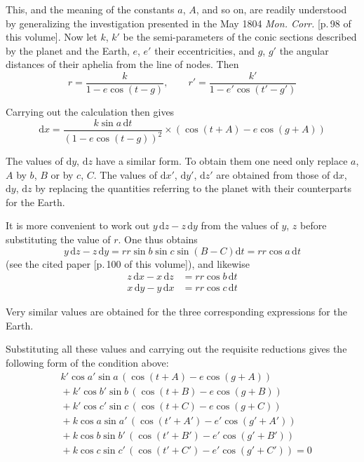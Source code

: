 This, and the meaning of the constants $a$, $A$, and so on, are
readily understood by generalizing the investigation presented in the
May 1804 \textit{Mon. Corr.} [p.\,98 of this volume]. Now let $k$, $k'$
%
be the semi-parameters of the conic sections described by the planet
and the Earth, $e$, $e'$ their eccentricities, and $g$, $g'$ the angular
distances of their aphelia from the line of nodes. Then
\[
r=\frac{k}{1-e\cos(t-g)},\qquad r'=\frac{k'}{1-e'\cos(t'-g')}
\]

Carrying out the calculation then gives
\[
\mathrm{d}x=\frac{k\sin a\,\mathrm{d}t}{(1-e\cos(t-g))^2}\times(\cos(t+A)-e\cos(g+A))
\]

The values of $\mathrm{d}y$, $\mathrm{d}z$ have a similar form. To
obtain them one need only replace $a$, $A$ by $b$, $B$ or by $c$, $C$.
The values of $\mathrm{d}x'$, $\mathrm{d}y'$, $\mathrm{d}z'$ are obtained
from those of $\mathrm{d}x$, $\mathrm{d}y$, $\mathrm{d}z$ by replacing the
quantities referring to the planet with their counterparts for the Earth.

It is more convenient to work out $y\,\mathrm{d}z-z\,\mathrm{d}y$
from the values of $y$, $z$ before substituting the value of $r$.
One thus obtains
\[
y\,\mathrm{d}z-z\,\mathrm{d}y=rr\sin b\sin c\sin(B-C)\mathrm{d}t=rr\cos a\,\mathrm{d}t
\]
(see the cited paper [p.\,100 of this volume]), and likewise
\[
\begin{aligned}
z\,\mathrm{d}x-x\,\mathrm{d}z&=rr\cos b\,\mathrm{d}t\\
x\,\mathrm{d}y-y\,\mathrm{d}x&=rr\cos c\,\mathrm{d}t
\end{aligned}
\]

Very similar values are obtained for the three corresponding
expressions for the Earth.

Substituting all these values and carrying out the requisite
reductions gives the following form of the condition above:
\[
\begin{aligned}
&k'\cos a'\sin a\,(\cos(t+A)-e\cos(g+A))\\
&{}+k'\cos b'\sin b\,(\cos(t+B)-e\cos(g+B))\\
&{}+k'\cos c'\sin c\,(\cos(t+C)-e\cos(g+C))\\
&{}+k\cos a\sin a'\,(\cos(t'+A')-e'\cos(g'+A'))\\
&{}+k\cos b\sin b'\,(\cos(t'+B')-e'\cos(g'+B'))\\
&{}+k\cos c\sin c'\,(\cos(t'+C')-e'\cos(g'+C'))=0
\end{aligned}
\]

